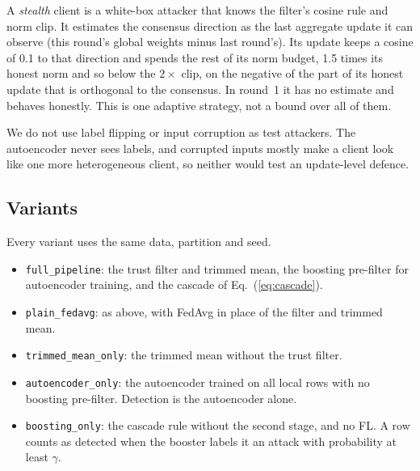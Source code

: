 A \emph{stealth} client is a white-box attacker that knows the filter's cosine rule and norm clip. It estimates the consensus direction as the last aggregate update it can observe (this round's global weights minus last round's). Its update keeps a cosine of 0.1 to that direction and spends the rest of its norm budget, 1.5 times its honest norm and so below the $2\times$ clip, on the negative of the part of its honest update that is orthogonal to the consensus. In round~1 it has no estimate and behaves honestly. This is one adaptive strategy, not a bound over all of them.

We do not use label flipping or input corruption as test attackers. The autoencoder never sees labels, and corrupted inputs mostly make a client look like one more heterogeneous client, so neither would test an update-level defence.

\subsection{Variants}
Every variant uses the same data, partition and seed.
\begin{itemize}
  \item \texttt{full\_pipeline}: the trust filter and trimmed mean, the boosting pre-filter for autoencoder training, and the cascade of Eq.~(\ref{eq:cascade}).
  \item \texttt{plain\_fedavg}: as above, with FedAvg in place of the filter and trimmed mean.
  \item \texttt{trimmed\_mean\_only}: the trimmed mean without the trust filter.
  \item \texttt{autoencoder\_only}: the autoencoder trained on all local rows with no boosting pre-filter. Detection is the autoencoder alone.
  \item \texttt{boosting\_only}: the cascade rule without the second stage, and no FL. A row counts as detected when the booster labels it an attack with probability at least $\gamma$.
\end{itemize}

